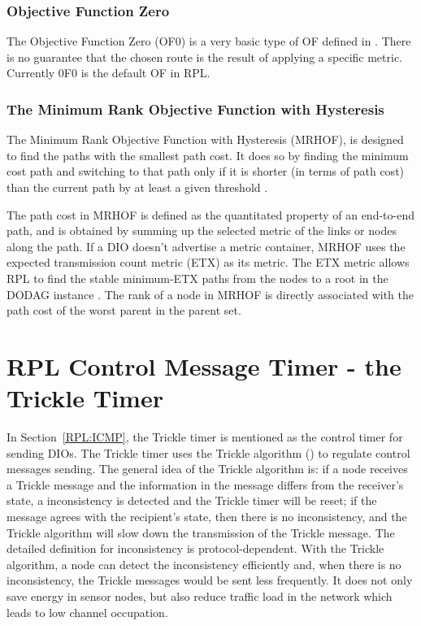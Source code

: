 \subsubsection{Objective Function Zero}
\label{RPL:OF0}
The Objective Function Zero (OF0) is a very basic type of OF defined in \cite{draft-ietf-roll-of0-20}. There is no guarantee that the chosen route is the result of applying a specific metric. Currently 0F0 is the default OF in RPL.
 
\subsubsection{The Minimum Rank Objective Function with Hysteresis}
\label{RPL:MRHOF}
The Minimum Rank Objective Function with Hysteresis (MRHOF)\@, is designed to find the paths with the smallest path cost. It does so by finding the minimum cost path and switching to that path only if it is shorter (in terms of path cost) than the current path by at least a given threshold \cite{MRHOF}. 

The path cost in MRHOF is defined as the quantitated property of an end-to-end path, and is obtained by summing up the selected metric of the links or nodes along the path. If a DIO doesn't advertise a metric container, MRHOF uses the expected transmission count metric (ETX) as its metric. The ETX metric allows RPL to find the stable minimum-ETX paths from the nodes to a root in the DODAG instance \cite{MRHOF}. The rank of a node in MRHOF is directly associated with the path cost of the worst parent in the parent set.

\section{RPL Control Message Timer - the Trickle Timer}
\label{Trickle}
In Section~\ref{RPL:ICMP}, the Trickle timer is mentioned as the control timer for sending DIOs. The Trickle timer uses the Trickle algorithm (\cite{RFC 6206}) to regulate control messages sending. The general idea of the Trickle algorithm is: if a node receives a Trickle message and the information in the message differs from the receiver's state, a inconsistency is detected and the Trickle timer will be reset; if the message agrees with the recipient's state, then there is no inconsistency, and the Trickle algorithm will slow down the transmission of the Trickle message. The detailed definition for inconsistency is protocol-dependent. With the Trickle algorithm, a node can detect the inconsistency efficiently and, when there is no inconsistency, the Trickle messages would be sent less frequently. It does not only save energy in sensor nodes, but also reduce traffic load in the network which leads to low channel occupation. 

